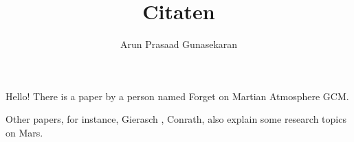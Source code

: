 \documentclass[10pt,a4paper]{article}
\author{Arun Prasaad Gunasekaran}
\title{Citaten}
\begin{document}
\maketitle

Hello!
There is a paper by a person named
Forget \citep{forget_1991} on Martian Atmosphere GCM.

Other papers, for instance,
Gierasch \citep{gierasch1968study}, Conrath, \cite{conrath1975thermal}
also explain some research topics on Mars.


\end{document}
